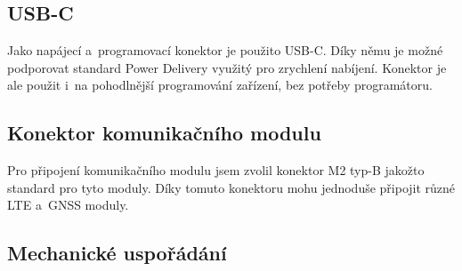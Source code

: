 \subsection{USB-C}
Jako napájecí a~programovací konektor je použito USB-C.
Díky němu je možné podporovat standard Power Delivery využitý pro zrychlení nabíjení.
Konektor je ale použit i~na pohodlnější programování zařízení, bez potřeby programátoru.

\subsection{Konektor komunikačního modulu}
Pro připojení komunikačního modulu jsem zvolil konektor M2 typ-B jakožto standard pro tyto moduly.
Díky tomuto konektoru mohu jednoduše připojit různé LTE a~GNSS moduly.

\subsection{Mechanické uspořádání}

